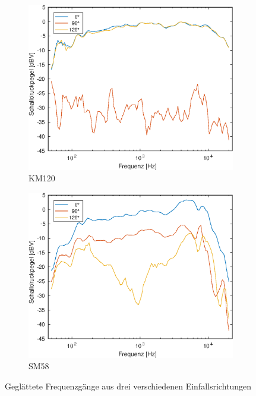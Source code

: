 \begin{figure}[b]
    \centering
    \begin{subfigure}{.5\textwidth}
        \centering
        \caption{KM120}
        \includegraphics[width=0.95\linewidth]{Figures/km120_all}
    \end{subfigure}%
    \begin{subfigure}{.5\textwidth}
        \centering
        \caption{SM58}
        \includegraphics[width=0.95\linewidth]{Figures/sm58_all.eps}
    \end{subfigure}
    \caption{Geglättete Frequenzgänge aus drei verschiedenen Einfallsrichtungen}
    \label{fig:freq_all}
\end{figure}


